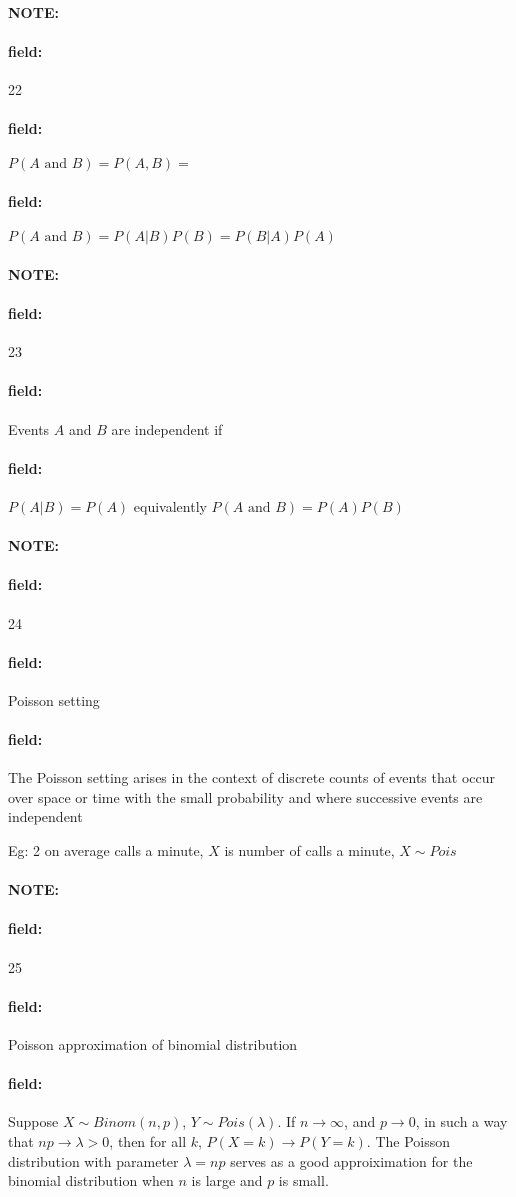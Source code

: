\documentclass[12pt]{article}
\newenvironment{note}{\paragraph{NOTE:}}{}
\newenvironment{field}{\paragraph{field:}}{}
\begin{document}
\begin{note}
  \begin{field}
    \tiny 22
  \end{field}
  \begin{field}
    $P(A \text{ and }B) = P(A,B) = $
  \end{field}
  \begin{field}
    $P(A \text{ and }B) = P(A|B)P(B) = P(B|A)P(A)$
  \end{field}
\end{note}



\begin{note}
  \begin{field}
    \tiny 23
  \end{field}
  \begin{field}
    Events $A$ and $B$ are independent if
  \end{field}
  \begin{field}
    $P(A|B) = P(A)$ equivalently $P(A \text{ and } B)  = P(A)P(B)$
  \end{field}
\end{note}

\begin{note}
  \begin{field}
    \tiny 24
  \end{field}
  \begin{field}
    Poisson setting
  \end{field}
  \begin{field}
    The Poisson setting arises in the context of discrete counts of events that occur over space or time with the small probability and where successive events are independent

    Eg: 2 on average calls a minute, $X$ is number of calls a minute, $X \sim Pois $
  \end{field}
\end{note}

\begin{note}
  \begin{field}
    \tiny 25
  \end{field}
  \begin{field}
    Poisson approximation of binomial distribution
  \end{field}
  \begin{field}
    Suppose $X \sim Binom(n,p)$, $Y \sim Pois (\lambda)$. If $n\to \infty$, and $p \to 0$, in such a way that $np \to \lambda > 0$, then for all $k$, $P(X = k) \to P(Y = k)$. The Poisson distribution with parameter $\lambda = np$ serves as a good approiximation for the binomial distribution when $n$ is large and $p$ is small.
  \end{field}
\end{note}
\end{document}
